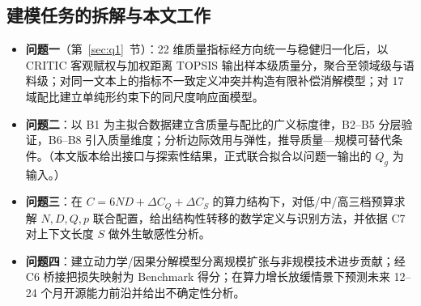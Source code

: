 \subsection{建模任务的拆解与本文工作}
\begin{itemize}
  \item \textbf{问题一}（第~\ref{sec:q1}~节）：22 维质量指标经方向统一与稳健归一化后，以 CRITIC 客观赋权与加权距离 TOPSIS 输出样本级质量分，聚合至领域级与语料级；对同一文本上的指标不一致定义冲突并构造有限补偿消解模型；对 17 域配比建立单纯形约束下的同尺度响应面模型。
  \item \textbf{问题二}：以 B1 为主拟合数据建立含质量与配比的广义标度律，B2--B5 分层验证，B6--B8 引入质量维度；分析边际效用与弹性，推导质量—规模可替代条件。（本文版本给出接口与探索性结果，正式联合拟合以问题一输出的 $Q_g$ 为输入。）
  \item \textbf{问题三}：在 $C=6ND+\Delta C_Q+\Delta C_S$ 的算力结构下，对低/中/高三档预算求解 $N,D,Q,p$ 联合配置，给出结构性转移的数学定义与识别方法，并依据 C7 对上下文长度 $S$ 做外生敏感性分析。
  \item \textbf{问题四}：建立动力学/因果分解模型分离规模扩张与非规模技术进步贡献；经 C6 桥接把损失映射为 Benchmark 得分；在算力增长放缓情景下预测未来 12--24 个月开源能力前沿并给出不确定性分析。
\end{itemize}
